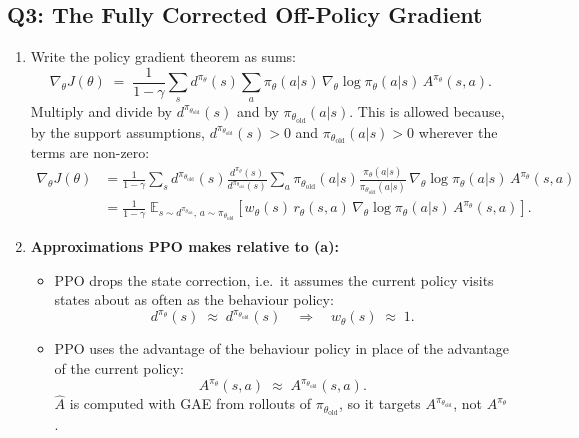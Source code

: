 \documentclass[11pt]{article}
\newcommand{\piold}{\pi_{\theta_{\mathrm{old}}}}
\newcommand{\Ahat}{\hat{A}}
\newcommand{\E}{\mathbb{E}}
\begin{document}
\subsection*{Q3: The Fully Corrected Off-Policy Gradient}
\begin{enumerate}[label=(\alph*)]
  \item Write the policy gradient theorem as sums:
        \[
          \nabla_\theta J(\theta) \;=\; \frac{1}{1-\gamma}\sum_s d^{\pi_\theta}(s)
          \sum_a \pi_\theta(a|s)\,\nabla_\theta \log \pi_\theta(a|s)\, A^{\pi_\theta}(s,a).
        \]
        Multiply and divide by $d^{\piold}(s)$ and by $\piold(a|s)$. This is allowed because, by the
        support assumptions, $d^{\piold}(s) > 0$ and $\piold(a|s) > 0$ wherever the terms are non-zero:
        \begin{align*}
          \nabla_\theta J(\theta) & = \frac{1}{1-\gamma}\sum_s d^{\piold}(s)
          \frac{d^{\pi_\theta}(s)}{d^{\piold}(s)}
          \sum_a \piold(a|s)
          \frac{\pi_\theta(a|s)}{\piold(a|s)}\,
          \nabla_\theta \log \pi_\theta(a|s)\, A^{\pi_\theta}(s,a)           \\[4pt]
                                  & = \frac{1}{1-\gamma}\;
          \E_{s \sim d^{\piold},\, a \sim \piold}
          \!\left[
              w_\theta(s)\, r_\theta(s,a)\, \nabla_\theta \log \pi_\theta(a|s)\, A^{\pi_\theta}(s,a)
              \right].
        \end{align*}

  \item \textbf{Approximations PPO makes relative to (a):}
        \begin{itemize}
          \item PPO drops the state correction, i.e.\ it assumes the current policy visits states about
                as often as the behaviour policy:
                \[
                  d^{\pi_\theta}(s) \;\approx\; d^{\piold}(s)
                  \quad\Rightarrow\quad
                  w_\theta(s) \;\approx\; 1.
                \]

          \item PPO uses the advantage of the behaviour policy in place of the advantage of the current
                policy:
                \[
                  A^{\pi_{\theta}}(s, a) \;\approx\; A^{\piold}(s, a).
                \]
                $\Ahat$ is computed with GAE from rollouts of $\piold$, so it targets $A^{\piold}$, not
                $A^{\pi_\theta}$.
        \end{itemize}


\end{enumerate}
\end{document}
